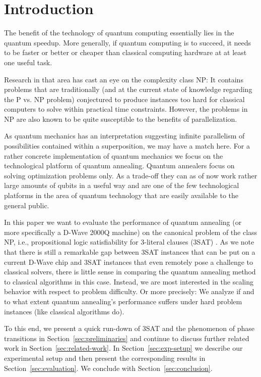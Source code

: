 \section{Introduction}

The benefit of the technology of quantum computing essentially lies in the quantum speedup. More generally, if quantum computing is to succeed, it needs to be faster or better or cheaper than classical computing hardware at at least one useful task.

Research in that area has cast an eye on the complexity class NP: It contains problems that are traditionally (and at the current state of knowledge regarding the P vs. NP problem) conjectured to produce instances too hard for classical computers to solve within practical time constraints. However, the problems in NP are also known to be quite susceptible to the benefits of parallelization.

As quantum mechanics has an interpretation suggesting infinite parallelism of possibilities contained within a superposition, we may have a match here. For a rather concrete implementation of quantum mechanics we focus on the technological platform of quantum annealing. Quantum annealers focus on solving optimization problems only. As a trade-off they can as of now work rather large amounts of qubits in a useful way and are one of the few technological platforms in the area of quantum technology that are easily available to the general public.

In this paper we want to evaluate the performance of quantum annealing (or more specifically a D-Wave 2000Q machine) on the canonical problem of the class NP, i.e., propositional logic satisfiability for 3-literal clauses (3SAT) \cite{cook1971complexity}. As we note that there is still a remarkable gap between 3SAT instances that can be put on a current D-Wave chip and 3SAT instances that even remotely pose a challenge to classical solvers, there is little sense in comparing the quantum annealing method to classical algorithms in this case. Instead, we are most interested in the scaling behavior with respect to problem difficulty. Or more precisely: We analyze if and to what extent quantum annealing's performance suffers under hard problem instances (like classical algorithms do).

To this end, we present a quick run-down of 3SAT and the phenomenon of phase transitions in Section~\ref{sec:preliminaries} and continue to discuss further related work in Section~\ref{sec:related-work}. In Section~\ref{sec:exp-setup} we describe our experimental setup and then present the corresponding results in Section~\ref{sec:evaluation}. We conclude with Section~\ref{sec:conclusion}.
